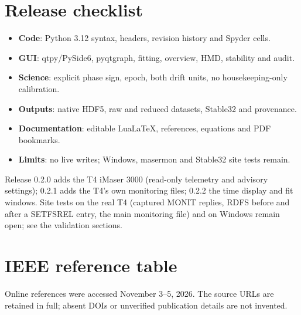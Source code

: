 \documentclass[11pt,a4paper]{article}
\begin{document}
\section{Release checklist}
\begin{itemize}
\item \textbf{Code}: Python 3.12 syntax, headers, revision history and Spyder cells.
\item \textbf{GUI}: qtpy/PySide6, pyqtgraph, fitting, overview, HMD, stability and audit.
\item \textbf{Science}: explicit phase sign, epoch, both drift units, no housekeeping-only calibration.
\item \textbf{Outputs}: native HDF5, raw and reduced datasets, Stable32 and provenance.
\item \textbf{Documentation}: editable LuaLaTeX, references, equations and PDF bookmarks.
\item \textbf{Limits}: no live writes; Windows, masermon and Stable32 site tests remain.
\end{itemize}

Release 0.2.0 adds the T4 iMaser 3000 (read-only telemetry and advisory
settings); 0.2.1 adds the T4's own monitoring files; 0.2.2 the time display and fit windows.
Site tests on the real T4
(captured MONIT replies, RDFS before and after a SETFSREL entry, the main
monitoring file) and on Windows remain open; see the validation sections.

\section{IEEE reference table}
Online references were accessed November 3--5, 2026. The source URLs are retained
in full; absent DOIs or unverified publication details are not invented.
\end{document}
